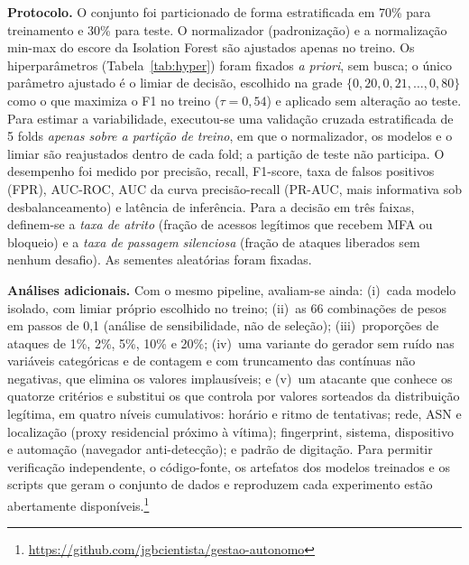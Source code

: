 \documentclass[conference]{IEEEtran}
\begin{document}
\textbf{Protocolo.} O conjunto foi particionado de forma estratificada em
70\% para treinamento e 30\% para teste. O normalizador (padronização) e
a normalização min-max do escore da Isolation Forest são ajustados
apenas no treino. Os hiperparâmetros (Tabela~\ref{tab:hyper}) foram
fixados \emph{a priori}, sem busca; o único parâmetro ajustado é o limiar
de decisão, escolhido na grade $\{0{,}20, 0{,}21, \dots, 0{,}80\}$ como o
que maximiza o F1 no treino ($\tau=0{,}54$) e aplicado sem alteração ao
teste. Para estimar a variabilidade, executou-se uma validação cruzada
estratificada de 5 folds \emph{apenas sobre a partição de treino}, em que
o normalizador, os modelos e o limiar são reajustados dentro de cada
fold; a partição de teste não participa. O desempenho foi medido por
precisão, recall, F1-score, taxa de falsos positivos (FPR), AUC-ROC,
AUC da curva precisão-recall (PR-AUC, mais informativa sob desbalanceamento)
e latência de inferência. Para a decisão em três faixas, definem-se a
\emph{taxa de atrito} (fração de acessos legítimos que recebem MFA ou
bloqueio) e a \emph{taxa de passagem silenciosa} (fração de ataques
liberados sem nenhum desafio). As sementes aleatórias foram fixadas.

\textbf{Análises adicionais.} Com o mesmo pipeline, avaliam-se ainda:
(i)~cada modelo isolado, com limiar próprio escolhido no treino;
(ii)~as 66 combinações de pesos em passos de 0,1 (análise de
sensibilidade, não de seleção); (iii)~proporções de ataques de 1\%, 2\%,
5\%, 10\% e 20\%; (iv)~uma variante do gerador sem ruído nas variáveis
categóricas e de contagem e com truncamento das contínuas não negativas,
que elimina os valores implausíveis; e (v)~um atacante que conhece os
quatorze critérios e substitui os que controla por valores sorteados da
distribuição legítima, em quatro níveis cumulativos: horário e ritmo de
tentativas; rede, ASN e localização (proxy residencial próximo à vítima);
fingerprint, sistema, dispositivo e automação (navegador
anti-detecção); e padrão de digitação.
Para permitir verificação independente, o código-fonte,
os artefatos dos modelos treinados e os scripts que geram o conjunto de
dados e reproduzem cada experimento estão abertamente
disponíveis.\footnote{\url{https://github.com/jgbcientista/gestao-autonomo}}
\end{document}
